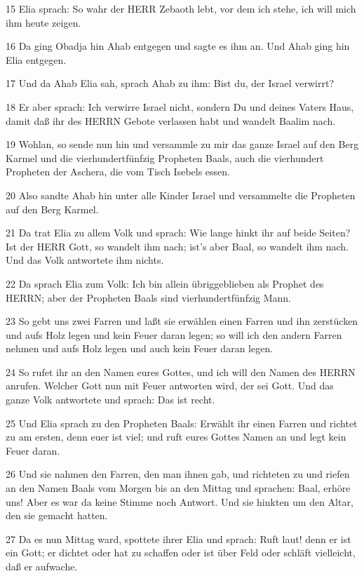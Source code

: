 \par 15 Elia sprach: So wahr der HERR Zebaoth lebt, vor dem ich stehe, ich will mich ihm heute zeigen.
\par 16 Da ging Obadja hin Ahab entgegen und sagte es ihm an. Und Ahab ging hin Elia entgegen.
\par 17 Und da Ahab Elia sah, sprach Ahab zu ihm: Bist du, der Israel verwirrt?
\par 18 Er aber sprach: Ich verwirre Israel nicht, sondern Du und deines Vaters Haus, damit daß ihr des HERRN Gebote verlassen habt und wandelt Baalim nach.
\par 19 Wohlan, so sende nun hin und versammle zu mir das ganze Israel auf den Berg Karmel und die vierhundertfünfzig Propheten Baals, auch die vierhundert Propheten der Aschera, die vom Tisch Isebels essen.
\par 20 Also sandte Ahab hin unter alle Kinder Israel und versammelte die Propheten auf den Berg Karmel.
\par 21 Da trat Elia zu allem Volk und sprach: Wie lange hinkt ihr auf beide Seiten? Ist der HERR Gott, so wandelt ihm nach; ist's aber Baal, so wandelt ihm nach. Und das Volk antwortete ihm nichts.
\par 22 Da sprach Elia zum Volk: Ich bin allein übriggeblieben als Prophet des HERRN; aber der Propheten Baals sind vierhundertfünfzig Mann.
\par 23 So gebt uns zwei Farren und laßt sie erwählen einen Farren und ihn zerstücken und aufs Holz legen und kein Feuer daran legen; so will ich den andern Farren nehmen und aufs Holz legen und auch kein Feuer daran legen.
\par 24 So rufet ihr an den Namen eures Gottes, und ich will den Namen des HERRN anrufen. Welcher Gott nun mit Feuer antworten wird, der sei Gott. Und das ganze Volk antwortete und sprach: Das ist recht.
\par 25 Und Elia sprach zu den Propheten Baals: Erwählt ihr einen Farren und richtet zu am ersten, denn euer ist viel; und ruft eures Gottes Namen an und legt kein Feuer daran.
\par 26 Und sie nahmen den Farren, den man ihnen gab, und richteten zu und riefen an den Namen Baals vom Morgen bis an den Mittag und sprachen: Baal, erhöre uns! Aber es war da keine Stimme noch Antwort. Und sie hinkten um den Altar, den sie gemacht hatten.
\par 27 Da es nun Mittag ward, spottete ihrer Elia und sprach: Ruft laut! denn er ist ein Gott; er dichtet oder hat zu schaffen oder ist über Feld oder schläft vielleicht, daß er aufwache.
